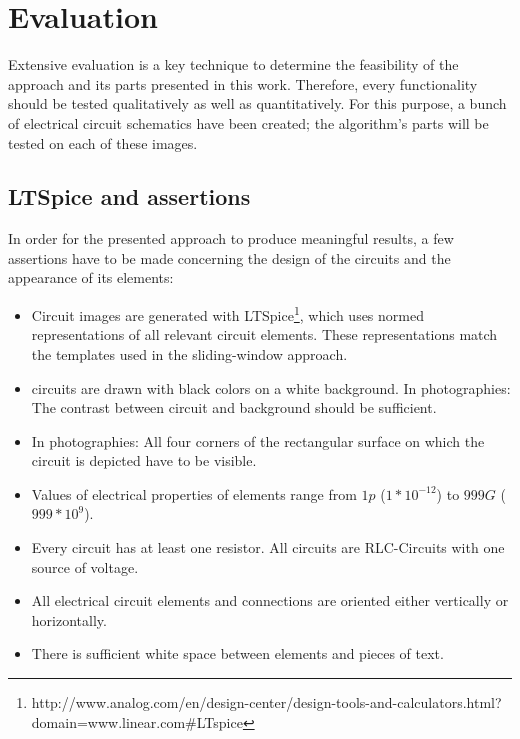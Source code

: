 \documentclass[10pt,twocolumn,letterpaper]{article}
\begin{document}

\section{Evaluation}
\label{sec:eval}

Extensive evaluation is a key technique to determine the feasibility of the approach and its parts presented in this work. Therefore, every functionality should be tested qualitatively as well as quantitatively. For this purpose, a bunch of electrical circuit schematics have been created; the algorithm's parts will be tested on each of these images. 
\par

\subsection{LTSpice and assertions}
\label{subsec:spice}

In order for the presented approach to produce meaningful results, a few assertions have to be made concerning the design of the circuits and the appearance of its elements:

\begin{itemize}
	\item Circuit images are generated with LTSpice\footnote[1]{http://www.analog.com/en/design-center/design-tools-and-calculators.html?domain=www.linear.com\#LTspice}, which uses normed representations of all relevant circuit elements. These representations match the templates used in the sliding-window approach.
	\item circuits are drawn with black colors on a white background. In photographies: The contrast between circuit and background should be sufficient.
	\item In photographies: All four corners of the rectangular surface on which the circuit is depicted have to be visible.
	\item Values of electrical properties of elements range from $1p$ ($1 * 10^{-12}$) to $999G$ ($999* 10^{9}$).
	\item Every circuit has at least one resistor. All circuits are RLC-Circuits with one source of voltage.
	\item All electrical circuit elements and connections are oriented either vertically or horizontally.
	\item There is sufficient white space between elements and pieces of text.
\end{itemize}
\par
\end{document}
